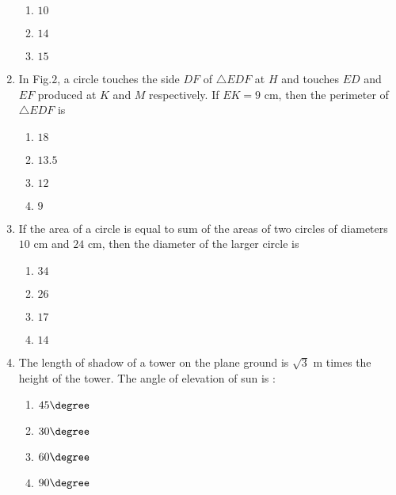 \begin{enumerate}
\begin{enumerate}
\item $10$\\
\item $14$\\
\item $15$\\
\end{enumerate}
\item In Fig.$2$, a circle touches the side $DF$ of $\triangle EDF$ at $H$ and touches $ED$ and $EF$ produced at $K$ and $M$ respectively. If $EK = 9\text{ cm}$, then the perimeter of $\triangle EDF$  is\\
\begin{enumerate}
\item $18$\\
\item $13.5$\\
\item $12$\\
\item $9$\\
\end{enumerate}
\item If the area of a circle is equal to sum of the areas of two circles of diameters $10 \text{ cm}$ and $24 \text{ cm}$, then the diameter of the larger circle  is\\
\begin{enumerate}
\item $34$\\
\item $26$\\
\item $17$\\
\item $14$\\
\end{enumerate}
\item The length of shadow of a tower on the plane ground is $\sqrt 3 \text{ m}$ times the height of the tower. The angle of elevation of sun is :\\
\begin{enumerate}
\item $45\degree$\\
\item $30\degree$\\
\item $60\degree$\\
\item $90\degree$\\
\end{enumerate}

\end{enumerate}
